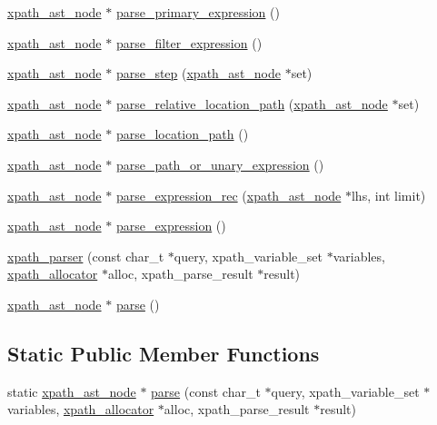 \begin{CompactItemize}
\item 
\hyperlink{classxpath__ast__node}{xpath\_\-ast\_\-node} $\ast$ \hyperlink{structxpath__parser_320728b83e426c4874066d633ffe65d9}{parse\_\-primary\_\-expression} ()
\item 
\hyperlink{classxpath__ast__node}{xpath\_\-ast\_\-node} $\ast$ \hyperlink{structxpath__parser_0530aefc1445c4eac4614e895dd0a219}{parse\_\-filter\_\-expression} ()
\item 
\hyperlink{classxpath__ast__node}{xpath\_\-ast\_\-node} $\ast$ \hyperlink{structxpath__parser_7daf146822e199d8ad564be25daa49db}{parse\_\-step} (\hyperlink{classxpath__ast__node}{xpath\_\-ast\_\-node} $\ast$set)
\item 
\hyperlink{classxpath__ast__node}{xpath\_\-ast\_\-node} $\ast$ \hyperlink{structxpath__parser_b50d8b75f78b7e2eb77a1cf6872daa00}{parse\_\-relative\_\-location\_\-path} (\hyperlink{classxpath__ast__node}{xpath\_\-ast\_\-node} $\ast$set)
\item 
\hyperlink{classxpath__ast__node}{xpath\_\-ast\_\-node} $\ast$ \hyperlink{structxpath__parser_ae61a2931ba0b0c713b5d043f1cef6d4}{parse\_\-location\_\-path} ()
\item 
\hyperlink{classxpath__ast__node}{xpath\_\-ast\_\-node} $\ast$ \hyperlink{structxpath__parser_9f5cab421e931c46b0598ecec60c5591}{parse\_\-path\_\-or\_\-unary\_\-expression} ()
\item 
\hyperlink{classxpath__ast__node}{xpath\_\-ast\_\-node} $\ast$ \hyperlink{structxpath__parser_dfd2ab26b101a03ed79d7c3041539115}{parse\_\-expression\_\-rec} (\hyperlink{classxpath__ast__node}{xpath\_\-ast\_\-node} $\ast$lhs, int limit)
\item 
\hyperlink{classxpath__ast__node}{xpath\_\-ast\_\-node} $\ast$ \hyperlink{structxpath__parser_db814ff3b99621d2a1c8e788ffd1c1c5}{parse\_\-expression} ()
\item 
\hyperlink{structxpath__parser_3f5b4a04f4d0a0a44962d9825a86ed0d}{xpath\_\-parser} (const char\_\-t $\ast$query, xpath\_\-variable\_\-set $\ast$variables, \hyperlink{classxpath__allocator}{xpath\_\-allocator} $\ast$alloc, xpath\_\-parse\_\-result $\ast$result)
\item 
\hyperlink{classxpath__ast__node}{xpath\_\-ast\_\-node} $\ast$ \hyperlink{structxpath__parser_581e576958037e1ab682fb952b3ada38}{parse} ()
\end{CompactItemize}
\subsection*{Static Public Member Functions}
\begin{CompactItemize}
\item 
static \hyperlink{classxpath__ast__node}{xpath\_\-ast\_\-node} $\ast$ \hyperlink{structxpath__parser_b865a9a777b466365b3c4bd50290189d}{parse} (const char\_\-t $\ast$query, xpath\_\-variable\_\-set $\ast$variables, \hyperlink{classxpath__allocator}{xpath\_\-allocator} $\ast$alloc, xpath\_\-parse\_\-result $\ast$result)
\end{CompactItemize}
